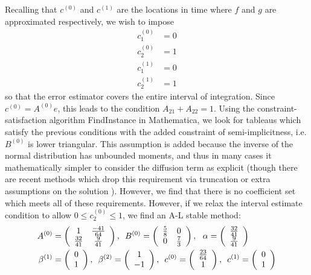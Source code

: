 \documentclass{article}
\begin{document}
Recalling that $c^{(0)}$ and $c^{(1)}$ are the locations in time
where $f$ and $g$ are approximated respectively, we wish to impose
\begin{align}
c_{1}^{(0)} & =0\label{eq:SRA_ccond}\\
c_{2}^{(0)} & =1\nonumber \\
c_{1}^{(1)} & =0\nonumber \\
c_{2}^{(1)} & =1\nonumber
\end{align}
so that the error estimator covers the entire interval of integration.
Since $c^{(0)}=A^{(0)}e$, this leads to the condition $A_{21}+A_{22}=1$.
Using the constraint-satisfaction algorithm FindInstance in Mathematica,
we look for tableaus which satisfy the previous conditions with the
added constraint of semi-implicitness, i.e. $B^{(0)}$ is lower triangular.
This assumption is added because the inverse of the normal distribution
has unbounded moments, and thus in many cases it mathematically simpler
to consider the diffusion term as explicit (though there are recent
methods which drop this requirement via truncation or extra assumptions
on the solution \cite{RN3806}). However, we find that there is no
coefficient set which meets all of these requirements. However, if
we relax the interval estimate condition to allow $0\leq c_{2}^{(0)}\leq1$,
we find an A-L stable method:
\begin{align}
A^{(0)} & =\left(\begin{array}{cc}
1 & \frac{-41}{64}\\
\frac{32}{41} & \frac{9}{41}
\end{array}\right),\thinspace\thinspace\thinspace B^{(0)}=\left(\begin{array}{cc}
\frac{5}{8} & 0\\
0 & \frac{7}{3}
\end{array}\right),\thinspace\thinspace\thinspace\thinspace\alpha=\left(\begin{array}{c}
\frac{32}{41}\\
\frac{9}{41}
\end{array}\right)\label{eq:LSRA}\\
\beta^{(1)} & =\left(\begin{array}{c}
0\\
1
\end{array}\right),\thinspace\thinspace\thinspace\beta^{(2)}=\left(\begin{array}{c}
1\\
-1
\end{array}\right),\thinspace\thinspace\thinspace c^{(0)}=\left(\begin{array}{c}
\frac{23}{64}\\
1
\end{array}\right),\,\,\,c^{(1)}=\left(\begin{array}{c}
0\\
1
\end{array}\right)\nonumber
\end{align}
\end{document}
